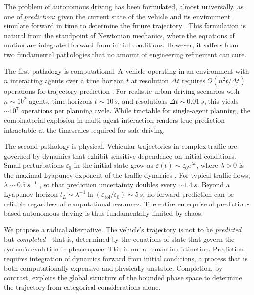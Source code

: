 \documentclass[twocolumn,10pt]{article}
\begin{document}
The problem of autonomous driving has been formulated, almost universally, as one of \emph{prediction}: given the current state of the vehicle and its environment, simulate forward in time to determine the future trajectory \cite{thrun2006, urmson2008, schwarting2018}. This formulation is natural from the standpoint of Newtonian mechanics, where the equations of motion are integrated forward from initial conditions. However, it suffers from two fundamental pathologies that no amount of engineering refinement can cure.

The first pathology is computational. A vehicle operating in an environment with $n$ interacting agents over a time horizon $t$ at resolution $\Delta t$ requires $O(n^2 t / \Delta t)$ operations for trajectory prediction \cite{helbing2001}. For realistic urban driving scenarios with $n \sim 10^2$ agents, time horizons $t \sim \SI{10}{s}$, and resolutions $\Delta t \sim \SI{0.01}{s}$, this yields $\sim 10^7$ operations per planning cycle. While tractable for single-agent planning, the combinatorial explosion in multi-agent interaction renders true prediction intractable at the timescales required for safe driving.

The second pathology is physical. Vehicular trajectories in complex traffic are governed by dynamics that exhibit sensitive dependence on initial conditions. Small perturbations $\varepsilon_0$ in the initial state grow as $\varepsilon(t) \sim \varepsilon_0 e^{\lambda t}$, where $\lambda > 0$ is the maximal Lyapunov exponent of the traffic dynamics \cite{kerner1993}. For typical traffic flows, $\lambda \sim \SI{0.5}{s^{-1}}$ \cite{helbing2001}, so that prediction uncertainty doubles every $\sim \SI{1.4}{s}$. Beyond a Lyapunov horizon $t_L \sim \lambda^{-1} \ln(\varepsilon_{\mathrm{tol}}/\varepsilon_0) \sim \SI{5}{s}$, no forward prediction can be reliable regardless of computational resources. The entire enterprise of prediction-based autonomous driving is thus fundamentally limited by chaos.

We propose a radical alternative. The vehicle's trajectory is not to be \emph{predicted} but \emph{completed}---that is, determined by the equations of state that govern the system's evolution in phase space. This is not a semantic distinction. Prediction requires integration of dynamics forward from initial conditions, a process that is both computationally expensive and physically unstable. Completion, by contrast, exploits the global structure of the bounded phase space to determine the trajectory from categorical considerations alone.
\end{document}
